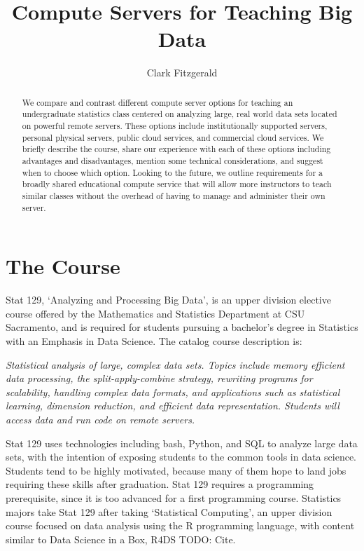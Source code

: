 \documentclass[12pt]{article}
\title{Compute Servers for Teaching Big Data}
\author{Clark Fitzgerald}
\begin{document}
\maketitle

\begin{abstract}

    We compare and contrast different compute server options for teaching an undergraduate statistics class centered on analyzing large, real world data sets located on powerful remote servers.
These options include institutionally supported servers, personal physical servers, public cloud services, and commercial cloud services.
We briefly describe the course, share our experience with each of these options including advantages and disadvantages, mention some technical considerations, and suggest when to choose which option.
Looking to the future, we outline requirements for a broadly shared educational compute service that will allow more instructors to teach similar classes without the overhead of having to manage and administer their own server.

\end{abstract}




\section{The Course}

Stat 129, `Analyzing and Processing Big Data', is an upper division elective course offered by the Mathematics and Statistics Department at CSU Sacramento, and is required for students pursuing a bachelor's degree in Statistics with an Emphasis in Data Science.
The catalog course description is:

\emph{
Statistical analysis of large, complex data sets. Topics include memory efficient data processing, the split-apply-combine strategy, rewriting programs for scalability, handling complex data formats, and applications such as statistical learning, dimension reduction, and efficient data representation. Students will access data and run code on remote servers.
}

Stat 129 uses technologies including bash, Python, and SQL to analyze large data sets, with the intention of exposing students to the common tools in data science.
Students tend to be highly motivated, because many of them hope to land jobs requiring these skills after graduation.
Stat 129 requires a programming prerequisite, since it is too advanced for a first programming course.
Statistics majors take Stat 129 after taking `Statistical Computing', an upper division course focused on data analysis using the R programming language, with content similar to Data Science in a Box, R4DS TODO: Cite.
\end{document}
